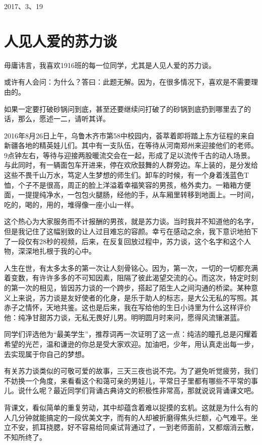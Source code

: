 \documentclass[openany]{ctexbook}
\begin{document}
2017、3、19

\chapter*{人见人爱的苏力谈}\label{sulitan}

毋庸讳言，我喜欢1916班的每一位同学，尤其是人见人爱的苏力谈。

或许有人会问：为什么？答曰：此题无解。因为，在很多情况下，喜欢是不需要理由的。

如果一定要打破砂锅问到底，甚至还要继续问打破了的砂锅到底扔到哪里去了的话，那么，愿述一二，请听其详。

2016年8月26日上午，乌鲁木齐市第58中校园内，荟萃着即将踏上东方征程的来自新疆各地的精英娃儿们。其中有一支队伍，在等待从河南郑州来迎接他们的老师。9点钟左右，等待与迎接两股暖流交会在一起，形成了足以流传千古的动人场景。与此同时，有一辆面包车开进来，停在欢欣鼓舞的人群旁边。车上装的，是分发给这些不畏千山万水，笃定人生梦想的师生们。卸车的时候，有一个身着浅蓝色T恤，个子不是很高，周正的脸上洋溢着幸福笑容的男孩，格外卖力。一箱箱方便面，一提提纯净水，一包包火腿肠，经他的手，从车厢里转移到地面上。一时间，吃的，喝的，用的，堆得像一座小山一样。

这个热心为大家服务而不计报酬的男孩，就是苏力谈。当时我并不知道他的名字，但是我记住了这幅别致的让人过目难忘的容颜。幸亏在感动之余，我下意识地拍下了一段仅有28秒的视频，后来，在反复回放过程中，苏力谈，这个名字和这个人物，深深地扎根于我的心中。

人生在世，有太多太多的第一次让人刻骨铭心。因为，第一次，一切的一切都充满着变数，有许许多多的不可知因素，阻隔了彼此渴望交流的心。而这次，特定时刻的第一次的相见，皆因苏力谈的一个跨步，搭起了陌生人之间沟通的桥梁。某种意义上来说，苏力谈是友好使者的化身，是乐于助人的标志，是大公无私的写照。其赤子之情怀，天地共鉴。这也是后来，我在写给他的生日小诗里为什么这样评价他：纯净甘甜苏力谈，无私无畏好儿男。明明圆月时来问，愿得风流镶湛蓝。

同学们评选他为``最美学生''，推荐词再一次证明了这一点：纯洁的瞳孔总是闪耀着希望的光芒，温和谦逊的你总是受大家欢迎。加油吧，少年，用认真走出每一步，去实现属于你自己的梦想。

有关苏力谈类似的可敬可爱的故事，三天三夜也说不完。为了避免听觉疲劳，我们不妨换一个角度，来看看这个和蔼可亲的男娃儿，平常日子里都有哪些不平常的事儿。说什么呢？最近同学们背诵古典诗文的积极性非常高，那就说说背诵课文吧。

背课文，看似简单的重复劳动，其中却蕴含着难以捉摸的玄机。这就是为什么有的人几分钟就能搞定的一段优美文字，而有的人却被折磨得焦头烂额，心气难平。坐立不安，抓耳挠腮，好不容易给同桌试背通过了，一到老师面前，又都烟消云散，不知所终了。
\end{document}
